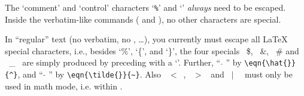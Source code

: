 The `comment' and `control' characters `\texttt{\%}' and `\bsl'
\emph{always} need to be escaped.  Inside the verbatim-like commands
( and ), no other characters are special.

In ``regular'' text (no verbatim, no , \ldots), you currently must
escape all \LaTeX{} special characters, i.e.,
besides `\%', `\{', and `\}', the four specials
\ \$, \ \&, \ \# and \ \_ \ are simply produced by preceding with a
`\bsl'.
Further, `` $\hat{}$ '' by \verb|\eqn{\hat{}}{^}|, and
       `` $\tilde{}$ '' by \verb|\eqn{\tilde{}}{~}|.
Also \ $<$\ , \ $>$ \  and \ $|$ \ \ must only be used in math mode, i.e. within .

